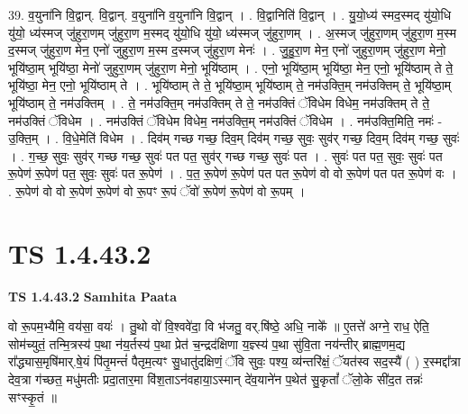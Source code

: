 \documentclass[17pt]{extarticle}
\begin{document}
39. व॒युना॑नि वि॒द्वान्. वि॒द्वान्. व॒युना॑नि व॒युना॑नि वि॒द्वान् । . वि॒द्वानिति॑ वि॒द्वान् । . यु॒यो॒ध्य॑ स्मद॒स्मद् यु॑यो॒धि यु॑यो॒ ध्य॑स्मज् जु॑हुरा॒णम् जु॑हुरा॒ण म॒स्मद् यु॑यो॒धि यु॑यो॒ ध्य॑स्मज् जु॑हुरा॒णम् । . अ॒स्मज् जु॑हुरा॒णम् जु॑हुरा॒ण म॒स्म द॒स्मज् जु॑हुरा॒ण मेन॒ एनो॑ जुहुरा॒ण म॒स्म द॒स्मज् जु॑हुरा॒ण मेनः॑ । . जु॒हु॒रा॒ण मेन॒ एनो॑ जुहुरा॒णम् जु॑हुरा॒ण मेनो॒ भूयि॑ष्ठा॒म् भूयि॑ष्ठा॒ मेनो॑ जुहुरा॒णम् जु॑हुरा॒ण मेनो॒ भूयि॑ष्ठाम् । . एनो॒ भूयि॑ष्ठा॒म् भूयि॑ष्ठा॒ मेन॒ एनो॒ भूयि॑ष्ठाम् ते ते॒ भूयि॑ष्ठा॒ मेन॒ एनो॒ भूयि॑ष्ठाम् ते । . भूयि॑ष्ठाम् ते ते॒ भूयि॑ष्ठा॒म् भूयि॑ष्ठाम् ते॒ नम॑उक्ति॒म् नम॑उक्तिम् ते॒ भूयि॑ष्ठा॒म् भूयि॑ष्ठाम् ते॒ नम॑उक्तिम् । . ते॒ नम॑उक्ति॒म् नम॑उक्तिम् ते ते॒ नम॑उक्तिं ॅविधेम विधेम॒ नम॑उक्तिम् ते ते॒ नम॑उक्तिं ॅविधेम । . नम॑उक्तिं ॅविधेम विधेम॒ नम॑उक्ति॒म् नम॑उक्तिं ॅविधेम । . नम॑उक्ति॒मिति॒ नमः॑ - उ॒क्ति॒म् । . वि॒धे॒मेति॑ विधेम । . दिव॑म् गच्छ गच्छ॒ दिव॒म् दिव॑म् गच्छ॒ सुवः॒ सुव॑र् गच्छ॒ दिव॒म् दिव॑म् गच्छ॒ सुवः॑ । . ग॒च्छ॒ सुवः॒ सुव॑र् गच्छ गच्छ॒ सुवः॑ पत पत॒ सुव॑र् गच्छ गच्छ॒ सुवः॑ पत । . सुवः॑ पत पत॒ सुवः॒ सुवः॑ पत रू॒पेण॑ रू॒पेण॑ पत॒ सुवः॒ सुवः॑ पत रू॒पेण॑ । . प॒त॒ रू॒पेण॑ रू॒पेण॑ पत पत रू॒पेण॑ वो वो रू॒पेण॑ पत पत रू॒पेण॑ वः । . रू॒पेण॑ वो वो रू॒पेण॑ रू॒पेण॑ वो रू॒पꣳ रू॒पं ॅवो॑ रू॒पेण॑ रू॒पेण॑ वो रू॒पम् । \newline
\pagebreak
{}

\section{ TS 1.4.43.2 }

\textbf{TS 1.4.43.2 } \newline
\textbf{Samhita Paata} \newline

वो रू॒पम॒भ्यैमि॒ वय॑सा॒ वयः॑ । तु॒थो वो॑ वि॒श्ववे॑दा॒ वि भ॑जतु॒ वर्.षि॑ष्ठे॒ अधि॒ नाके᳚ ॥ ए॒तत्ते॑ अग्ने॒ राध॒ ऐति॒ सोम॑च्युतं॒ तन्मि॒त्रस्य॑ प॒था न॑य॒र्तस्य॑ प॒था प्रेत॑ च॒न्द्रद॑क्षिणा य॒ज्ञ्स्य॑ प॒था सु॑वि॒ता नय॑न्तीर् ब्राह्म॒णम॒द्य रा᳚द्ध्यास॒मृषि॑मार्.षे॒यं पि॑तृ॒मन्तं॑ पैतृम॒त्यꣳ सु॒धातु॑दक्षिणं॒ ॅवि सुवः॒ पश्य॒ व्य॑न्तरि॑क्षं॒ ॅयत॑स्व सद॒स्यै॑ ( ) र॒स्मद्दा᳚त्रा देव॒त्रा ग॑च्छत॒ मधु॑मतीः प्रदा॒तार॒मा वि॑श॒ताऽन॑वहाया॒ऽस्मान् दे॑व॒याने॑न प॒थेत॑ सु॒कृतां᳚ ॅलो॒के सी॑द॒त तन्नः॑ सꣳस्कृ॒तं ॥ \newline
\end{document}
